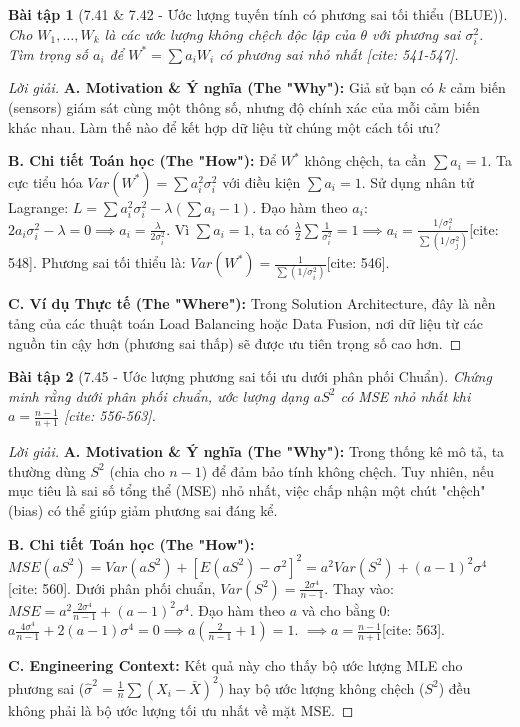 \documentclass[8pt,a4paper]{article}
\newtheorem{exercise}{Bài tập}
\newenvironment{solution}{\begin{proof}[Lời giải]}{\end{proof}}
\begin{document}
\begin{exercise}[7.41 \& 7.42 - Ước lượng tuyến tính có phương sai tối thiểu (BLUE)]
Cho $W_1, \dots, W_k$ là các ước lượng không chệch độc lập của $\theta$ với phương sai $\sigma_i^2$. Tìm trọng số $a_i$ để $W^* = \sum a_i W_i$ có phương sai nhỏ nhất [cite: 541-547].
\end{exercise}

\begin{solution}
\textbf{A. Motivation \& Ý nghĩa (The "Why"):} Giả sử bạn có $k$ cảm biến (sensors) giám sát cùng một thông số, nhưng độ chính xác của mỗi cảm biến khác nhau. Làm thế nào để kết hợp dữ liệu từ chúng một cách tối ưu?

\textbf{B. Chi tiết Toán học (The "How"):}
Để $W^*$ không chệch, ta cần $\sum a_i = 1$. Ta cực tiểu hóa $Var(W^*) = \sum a_i^2 \sigma_i^2$ với điều kiện $\sum a_i = 1$.
Sử dụng nhân tử Lagrange: $L = \sum a_i^2 \sigma_i^2 - \lambda(\sum a_i - 1)$.
Đạo hàm theo $a_i$: $2a_i \sigma_i^2 - \lambda = 0 \implies a_i = \frac{\lambda}{2\sigma_i^2}$.
Vì $\sum a_i = 1$, ta có $\frac{\lambda}{2} \sum \frac{1}{\sigma_i^2} = 1 \implies a_i = \frac{1/\sigma_i^2}{\sum (1/\sigma_j^2)}$[cite: 548].
Phương sai tối thiểu là: $Var(W^*) = \frac{1}{\sum (1/\sigma_i^2)}$[cite: 546].

\textbf{C. Ví dụ Thực tế (The "Where"):} Trong Solution Architecture, đây là nền tảng của các thuật toán Load Balancing hoặc Data Fusion, nơi dữ liệu từ các nguồn tin cậy hơn (phương sai thấp) sẽ được ưu tiên trọng số cao hơn.
\end{solution}

\begin{exercise}[7.45 - Ước lượng phương sai tối ưu dưới phân phối Chuẩn]
Chứng minh rằng dưới phân phối chuẩn, ước lượng dạng $aS^2$ có MSE nhỏ nhất khi $a = \frac{n-1}{n+1}$ [cite: 556-563].
\end{exercise}

\begin{solution}
\textbf{A. Motivation \& Ý nghĩa (The "Why"):} Trong thống kê mô tả, ta thường dùng $S^2$ (chia cho $n-1$) để đảm bảo tính không chệch. Tuy nhiên, nếu mục tiêu là sai số tổng thể (MSE) nhỏ nhất, việc chấp nhận một chút "chệch" (bias) có thể giúp giảm phương sai đáng kể.

\textbf{B. Chi tiết Toán học (The "How"):}
$MSE(aS^2) = Var(aS^2) + [E(aS^2) - \sigma^2]^2 = a^2 Var(S^2) + (a-1)^2 \sigma^4$[cite: 560].
Dưới phân phối chuẩn, $Var(S^2) = \frac{2\sigma^4}{n-1}$.
Thay vào: $MSE = a^2 \frac{2\sigma^4}{n-1} + (a-1)^2 \sigma^4$.
Đạo hàm theo $a$ và cho bằng 0: $a \frac{4\sigma^4}{n-1} + 2(a-1)\sigma^4 = 0 \implies a(\frac{2}{n-1} + 1) = 1$.
$\implies a = \frac{n-1}{n+1}$[cite: 563].

\textbf{C. Engineering Context:} Kết quả này cho thấy bộ ước lượng MLE cho phương sai ($\hat{\sigma}^2 = \frac{1}{n} \sum (X_i - \bar{X})^2$) hay bộ ước lượng không chệch ($S^2$) đều không phải là bộ ước lượng tối ưu nhất về mặt MSE.
\end{solution}
\end{document}
